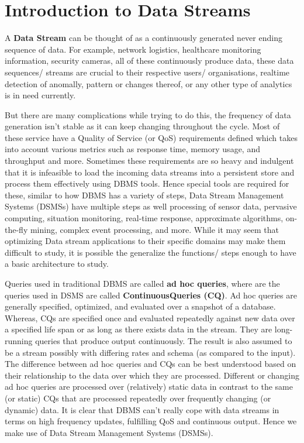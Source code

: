 \section{Introduction to Data Streams}
A \textbf{Data Stream} can be thought of as a continuously generated never ending sequence of data. For example, network logistics, healthcare monitoring information, security cameras, all of these continuously produce data, these data sequences/ streams are crucial to their respective users/ organisations, realtime detection of anomally, pattern or changes thereof, or any other type of analytics is in need currently.
\par But there are many complications while trying to do this, the frequency of data generation isn't stable as it can keep changing throughout the cycle. Most of these service have a Quality of Service (or QoS) requirements defined which takes into account various metrics such as response time, memory usage, and throughput and more. Sometimes these requirements are so heavy and indulgent that it is infeasible to load the incoming data streams into a persistent store and process them effectively using DBMS tools. Hence special tools are required for these, similar to how DBMS has a variety of steps, Data Stream Management Systems (DSMSs) have multiple steps as well processing of sensor data, pervasive computing, situation monitoring, real-time response, approximate algorithms, on-the-fly mining, complex event processing, and more. While it may seem that optimizing Data stream applications to their specific domains may make them difficult to study, it is possible the generalize the functions/ steps enough to have a basic architecture to study.
\par Queries used in traditional DBMS are called \textbf{ad hoc queries}, where are the queries used in DSMS are called \textbf{ContinuousQueries (CQ)}. Ad hoc queries are generally specified, optimized, and evaluated over a snapshot of a database. Whereas, CQs are specified once and evaluated repeatedly against new data over a specified life span or as long as there exists data in the stream. They are long-running queries that produce output continuously. The result is also assumed to be a stream possibly with differing rates and schema (as compared to the input). The difference between ad hoc queries and CQs can be best understood based on their relationship to the data over which they are processed. Different or changing ad hoc queries are processed over (relatively) static data in contrast to the same (or static) CQs that are processed repeatedly over frequently changing (or dynamic) data. It is clear that DBMS can't really cope with data streams in terms on high frequency updates, fulfilling QoS and continuous output. Hence we make use of Data Stream Management Systems (DSMSs).



